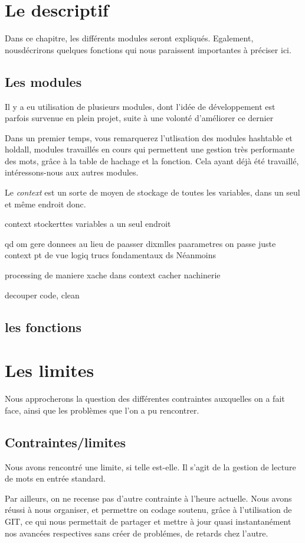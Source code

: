 \documentclass[12pt, letterpaper]{report}
\begin{document}
\chapter{Le descriptif}

Dans ce chapitre, les différents modules seront expliqués. Egalement, nousdécrirons quelques fonctions
qui nous paraissent importantes à préciser ici.

\section{Les modules}
Il y a eu utilisation de plusieurs modules, dont l'idée de développement est parfois survenue
en plein projet, suite à une volonté d'améliorer ce dernier

Dans un premier temps, vous remarquerez l'utlisation des modules hashtable et holdall,
modules travaillés en cours qui permettent une gestion très performante des mots, grâce
à la table de hachage et la fonction. Cela ayant déjà été travaillé, intéressons-nous 
aux autres modules.

Le \emph{context} est un sorte de moyen de stockage de toutes les variables, dans un seul
et même endroit donc.

context stockerttes variables a un seul endroit

qd om  gere donnees
au lieu de paasser dixmlles paarametres on passe juste context
pt de vue logiq trucs fondamentaux ds Néanmoins

processing de maniere xache dans context cacher nachinerie

decouper code, clean
\section{les fonctions}

\chapter{Les limites}
Nous approcherons la question des différentes contraintes 
auxquelles on a fait face, ainsi que les problèmes que l'on a pu rencontrer.

\section{Contraintes/limites}
Nous avons rencontré une limite, si telle est-elle. Il s'agit de la gestion 
de lecture de mots en entrée standard. 

Par ailleurs, on ne recense pas d'autre contrainte à l'heure actuelle.
Nous avons réussi à nous organiser, et permettre on codage soutenu,
grâce à l'utilisation de GIT, ce qui nous permettait de partager et mettre à jour quasi instantanément nos avancées respectives sans 
créer de problémes, de retards chez l'autre.
\end{document}
